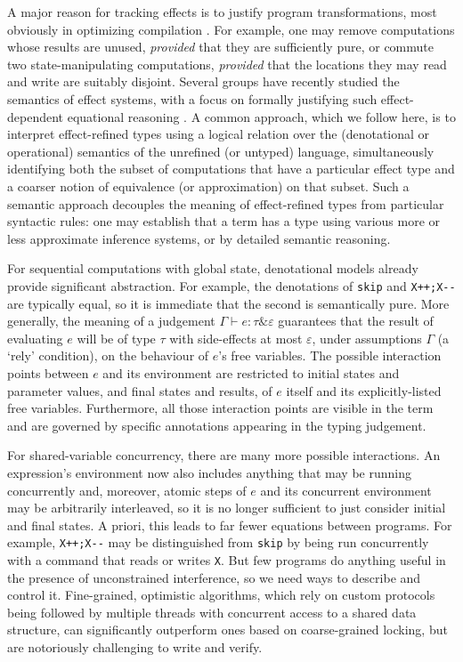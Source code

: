 \documentclass[nocopyrightspace,preprint]{sigplanconf}
\newcommand{\eff}{\varepsilon}
\begin{document}
A major reason for
tracking effects is to justify program
transformations, most obviously in optimizing compilation \cite{DBLP:conf/icfp/BentonKR98}. For example,
one may remove computations whose results are
unused, \emph{provided} that they are sufficiently pure, or commute two
state-manipulating computations, \emph{provided} that the locations they may
read and write are suitably disjoint. Several groups 
have recently studied the semantics of effect systems, with a focus on
formally justifying such effect-dependent equational reasoning \cite{DBLP:conf/popl/KammarP12,DBLP:conf/aplas/BentonKHB06,DBLP:dblp_conf/popl/Benton0N14,birkedal,DBLP:conf/icfp/ThamsborgB11}. A common approach, which we follow here, is to
interpret effect-refined types using a
logical relation over the (denotational or operational) semantics of
the unrefined (or untyped) language, simultaneously identifying both the
subset of computations that have a particular effect type and a
coarser notion of equivalence (or approximation) on that subset. Such
a semantic approach decouples the meaning of effect-refined types from
particular syntactic rules: one may establish that a term
has a type using various more or less approximate inference systems, or
by detailed semantic reasoning. 

For sequential computations with global state,  denotational
models already provide significant
abstraction. For example, the denotations of \verb|skip| and
\verb|X++;X--| are typically equal, so it is immediate that the
second is semantically pure. More generally, 
the meaning of a
judgement $\Gamma\vdash e:\tau \& \eff$ guarantees that the result of
evaluating $e$ will be of type $\tau$ with side-effects at most $\eff$,
under assumptions $\Gamma$ (a `rely' condition), on the behaviour of
$e$'s free variables. The possible interaction points
between $e$ and its environment are restricted to initial states and
parameter values, and final states and results, of $e$ itself and its
explicitly-listed free variables. Furthermore, all those interaction
points are visible in the term and are governed by specific
annotations appearing in the typing judgement.

For shared-variable concurrency, there are many more possible
interactions. An expression's environment now also includes anything
that may be running concurrently and, moreover, atomic steps of $e$
and its concurrent environment may be arbitrarily interleaved, so it
is no longer sufficient to just consider initial and final states. A
priori, this leads to far fewer equations between programs. For
example, \verb|X++;X--| may be distinguished from \verb|skip| by being
run concurrently with a command that reads or writes \verb|X|. But few
programs do anything useful in the presence of unconstrained
interference, so we need ways to describe and control
it. 
Fine-grained, optimistic algorithms, which rely on
custom protocols being followed by multiple threads with concurrent
access to a shared data structure, can significantly
outperform ones based on coarse-grained locking, but are notoriously
challenging to write and verify.
\end{document}
